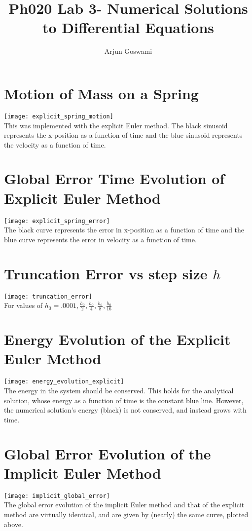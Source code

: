 \documentclass[11pt]{article} %
\title{Ph020 Lab 3-  Numerical Solutions to Differential Equations}
\author{Arjun Goswami}
\begin{document}
\maketitle

\section{Motion of Mass on a Spring}
\texttt{[image: explicit\_spring\_motion]}
\\
This was  implemented with the explicit Euler method. The black sinusoid represents the x-position as a function of time and the blue sinusoid represents the velocity as a function of time.

\section{Global Error Time Evolution of Explicit Euler Method}
\texttt{[image: explicit\_spring\_error]}
\\
The black curve represents the error in x-position as a function of time and the blue curve represents the error in velocity as a function of time.

\section{Truncation Error vs step size $h$}
\texttt{[image: truncation\_error]}
\\
For values of $h_0=.0001,\frac{h_0}{2}, \frac{h_0}{4}, \frac{h_0}{8}, \frac{h_0}{16}$

\section{Energy Evolution of the Explicit Euler Method}
\texttt{[image: energy\_evolution\_explicit]}
\\
The energy in the system should be conserved. This holds for the analytical solution, whose energy as a function of time is the constant blue line. However, the numerical solution's energy (black) is not conserved, and instead grows with time.

\section{Global Error Evolution of the Implicit Euler Method}
\texttt{[image: implicit\_global\_error]}
\\
The global error evolution of the implicit Euler method and that of the explicit method are virtually identical, and are given by (nearly) the same curve, plotted above. 
\end{document}
